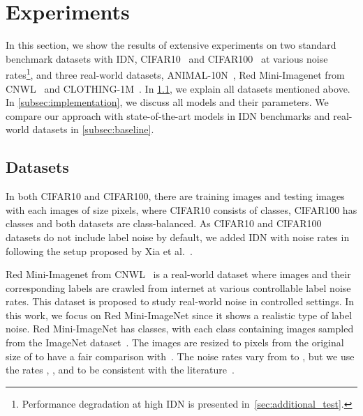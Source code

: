 \documentclass[10pt,twocolumn,letterpaper]{article}
\begin{document}
    
    
    
    
    
    
     \section{Experiments}
\label{sec:Experimentation}

    In this section, we show the results of extensive experiments on two standard benchmark datasets with IDN, CIFAR10~\cite{krizhevsky2009learning} and CIFAR100~\cite{krizhevsky2009learning} at various noise rates\footnote{Performance degradation at high IDN is presented in~\cref{sec:additional_test}.}, and three real-world datasets, ANIMAL-10N~\cite{song2019selfie}, Red Mini-Imagenet from CNWL~\cite{jiang2020beyond} and CLOTHING-1M~\cite{xiao2015learning}. In \cref{subsec:dataset}, we explain all  datasets mentioned above. In \cref{subsec:implementation}, we discuss all models and their parameters. 
    We compare our approach with state-of-the-art models in IDN benchmarks and real-world datasets
    in \cref{subsec:baseline}. 
    


    \subsection{Datasets}\label{subsec:dataset}
     In both CIFAR10 and CIFAR100, there are  training images and  testing images with each images of size  pixels, where CIFAR10 consists of  classes, CIFAR100 has   classes and both datasets are class-balanced. As CIFAR10 and CIFAR100 datasets do not include label noise by default, we added IDN with noise rates in  following the setup proposed by Xia et al.~\cite{xia2020part}.
     
     Red Mini-Imagenet from CNWL~\cite{jiang2020beyond} is a real-world dataset where images and their corresponding labels are crawled from internet at various controllable label noise rates. This dataset is proposed to study real-world noise in controlled settings. In this work, we focus on Red Mini-ImageNet since it shows a realistic type of label noise. Red Mini-ImageNet has  classes, with each class containing  images sampled from the ImageNet dataset~\cite{imagenet15russakovsky}. The images are resized to  pixels from the original size of  to have a fair comparison with~\cite{cordeiro2021propmix,xu2021faster}. The noise rates vary from  to , but we use the rates , ,  and  to be consistent with the literature~\cite{xu2021faster, yao2021instance, cordeiro2021propmix}.
     
\end{document}
